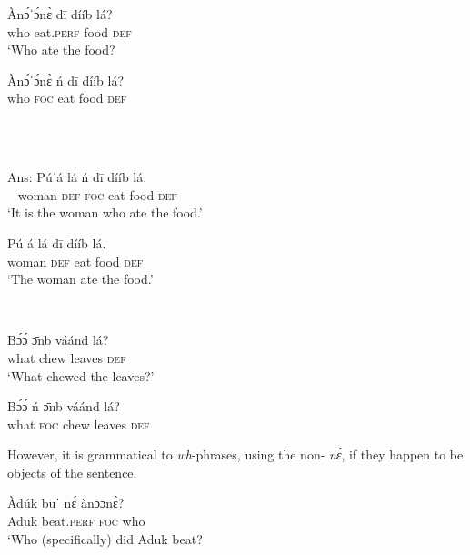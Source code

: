 \documentclass[output=paper,modfonts,nonflat,
 hidelinks
]{langsci/langscibook}
\begin{document}
{%
\noindent
      \parbox[t]{6.5cm}{
      \ea
      \gll Àn\'{ɔ}ˈ\'{ɔ}n\`{ɛ}   d\={i}     dííb  lá?     \\
	   who           eat.\textsc{perf}   food   \textsc{def}    \\
      \glt ‘Who ate the food?                            
      \z
      }
      \parbox[t]{5.5cm}{
      \ea\label{ex:abubakari:fnii}
      \gll *Àn\'{ɔ}ˈ\'{ɔ}n\`{ɛ}   ń   d\={i}   dííb  lá?    \\
      who                   \textsc{foc}  eat  food   \textsc{def}                            \\
      \glt ~
      \z
      }\\
      \parbox[t]{6.5cm}{     
      \ea
      \gll Ans: Púˈá     lá           ń    d\={i}   dííb  lá. \\
     ~          woman  \textsc{def}  \textsc{foc}  eat  food   \textsc{def} \\
      \glt ‘It is the woman who ate the food.’                          
      \z
      }\parbox[t]{5.5cm}{
      \ea\label{ex:abubakari:fniv}
      \gll Púˈá   lá   d\={i}   dííb  lá.\\
      woman  \textsc{def}   eat  food   \textsc{def}        \\
      \glt ‘The woman ate the food.’                              
      \z
      }\\
      \parbox[t]{6.5cm}{
      \ea
      \gll B\'{ɔ}\'{ɔ}   \={ɔ}nb  váánd  lá?     \\
      what  chew   leaves   \textsc{def}         \\
      \glt ‘What chewed the leaves?’        
      \z
      }\parbox[t]{5.5cm}{
      \ea\label{ex:abubakari:fnvi}
      \gll *B\'{ɔ}\'{ɔ}   ń   \={ɔ}nb  váánd  lá?     \\
      what   \textsc{foc}  chew   leaves   \textsc{def}\\
      \z 
      }
      
    However, it is grammatical to  \textit{wh}-phrases, using the non-  \textit{nɛ́}, if they happen to be objects of the sentence.  
    
 
    \ea 
    \gll Àdúk  b\={u}ˈ    nɛ́  ànɔɔn\`{ɛ}? \\ 
    Aduk  beat.\textsc{perf}   \textsc{foc}  who       \\
    \glt ‘Who (specifically) did Aduk beat?       
    \z
    
}
\end{document}
